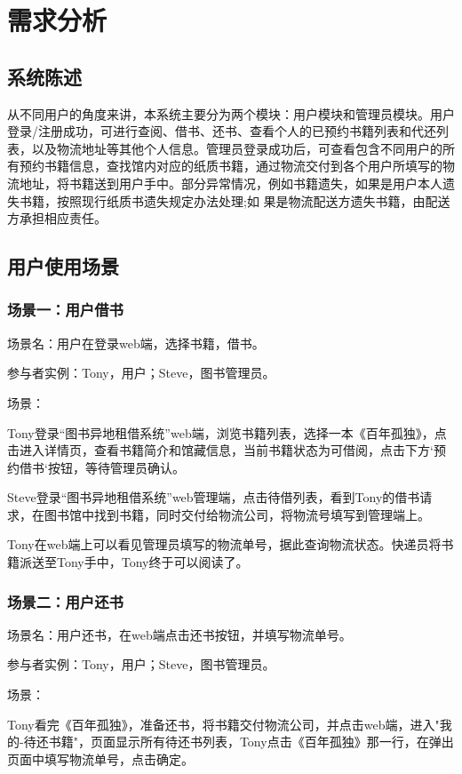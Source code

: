 
\chapter{需求分析}%
\section{系统陈述}
从不同用户的角度来讲，本系统主要分为两个模块：用户模块和管理员模块。用户登录/注册成功，可进行查阅、借书、还书、查看个人的已预约书籍列表和代还列表，以及物流地址等其他个人信息。管理员登录成功后，可查看包含不同用户的所有预约书籍信息，查找馆内对应的纸质书籍，通过物流交付到各个用户所填写的物流地址，将书籍送到用户手中。部分异常情况，例如书籍遗失，如果是用户本人遗失书籍，按照现行纸质书遗失规定办法处理;如
果是物流配送方遗失书籍，由配送方承担相应责任。
\section{用户使用场景}
\subsection{场景一：用户借书}
场景名：用户在登录web端，选择书籍，借书。

参与者实例：Tony，用户；Steve，图书管理员。

场景：

Tony登录“图书异地租借系统”web端，浏览书籍列表，选择一本《百年孤独》，点击进入详情页，查看书籍简介和馆藏信息，当前书籍状态为可借阅，点击下方`预约借书`按钮，等待管理员确认。

Steve登录“图书异地租借系统”web管理端，点击待借列表，看到Tony的借书请求，在图书馆中找到书籍，同时交付给物流公司，将物流号填写到管理端上。

Tony在web端上可以看见管理员填写的物流单号，据此查询物流状态。快递员将书籍派送至Tony手中，Tony终于可以阅读了。
\subsection{场景二：用户还书}
场景名：用户还书，在web端点击还书按钮，并填写物流单号。

参与者实例：Tony，用户；Steve，图书管理员。

场景：

Tony看完《百年孤独》，准备还书，将书籍交付物流公司，并点击web端，进入"我的-待还书籍"，页面显示所有待还书列表，Tony点击《百年孤独》那一行，在弹出页面中填写物流单号，点击确定。

